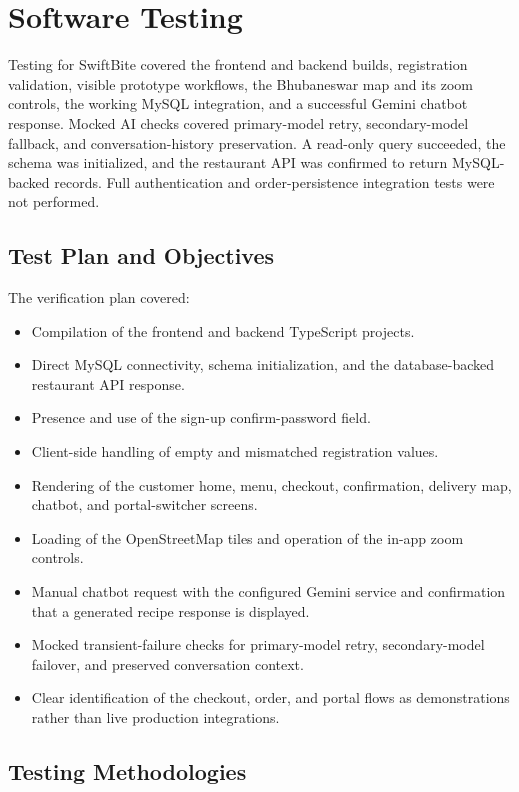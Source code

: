 \chapter{Software Testing}

Testing for SwiftBite covered the frontend and backend builds, registration validation, visible prototype workflows, the Bhubaneswar map and its zoom controls, the working MySQL integration, and a successful Gemini chatbot response. Mocked AI checks covered primary-model retry, secondary-model fallback, and conversation-history preservation. A read-only query succeeded, the schema was initialized, and the restaurant API was confirmed to return MySQL-backed records. Full authentication and order-persistence integration tests were not performed.

\section{Test Plan and Objectives}

The verification plan covered:
\begin{itemize}
    \item Compilation of the frontend and backend TypeScript projects.
    \item Direct MySQL connectivity, schema initialization, and the database-backed restaurant API response.
    \item Presence and use of the sign-up confirm-password field.
    \item Client-side handling of empty and mismatched registration values.
    \item Rendering of the customer home, menu, checkout, confirmation, delivery map, chatbot, and portal-switcher screens.
    \item Loading of the OpenStreetMap tiles and operation of the in-app zoom controls.
    \item Manual chatbot request with the configured Gemini service and confirmation that a generated recipe response is displayed.
    \item Mocked transient-failure checks for primary-model retry, secondary-model failover, and preserved conversation context.
    \item Clear identification of the checkout, order, and portal flows as demonstrations rather than live production integrations.
\end{itemize}

\section{Testing Methodologies}

